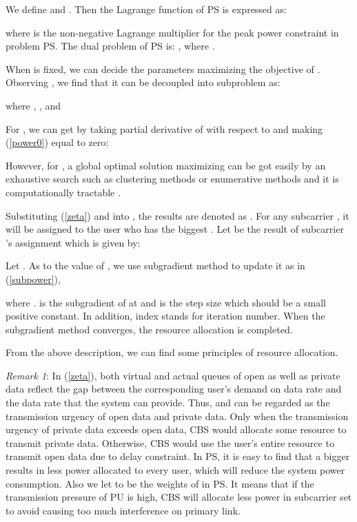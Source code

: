 \documentclass[journal]{IEEEtran}
\begin{document}
We define  and . Then the Lagrange function of PS is expressed
as:

where  is the non-negative Lagrange multiplier for the peak power constraint in problem PS.  The dual problem of
PS is:
,
where .


When  is fixed, we can decide the parameters  maximizing the objective of . Observing
, we find that it can be decoupled into  subproblem as:

where , ,
 and


 For , we can get  by taking partial derivative of 
 with respect to  and making (\ref{power0}) equal to zero:


 However, for ,  a  global optimal solution  maximizing  can be got easily by
 an exhaustive search such as clustering methods or enumerative methods\cite{horst1996global} and it is
 computationally tractable \cite{yu2006dual,cendrillon2006optimal}.






 Substituting (\ref{zeta}) and  into , the results are denoted as .
For any subcarrier , it will be assigned to the user who has the biggest . Let
 be the result of subcarrier 's assignment which is given by:



Let . As to the value of , we use subgradient method to
update it as in (\ref{subpower}),

where .   is the subgradient of   at  and
 is the step size which should be a small positive constant. In addition, index  stands for iteration number.
When the subgradient method converges, the resource allocation is completed.

From the above description, we can find some principles of  resource allocation.

\emph{Remark 1}: In (\ref{zeta}),  both virtual and actual
queues of open as well as private data reflect the gap  between the corresponding user's demand on data rate and the data
rate that the system can provide. Thus,  and  can be regarded as
the transmission urgency of open data and private data. Only when the transmission urgency of private data exceeds open data,
CBS would allocate some resource to transmit private data. Otherwise,  CBS would use the user's entire resource to transmit
open
data due to delay constraint. In PS, it is easy to find that a bigger  results in less power allocated to every user,
which will reduce the system power consumption. Also we let  to be the weights of  in PS. It means that if the
transmission pressure of PU is high, CBS will allocate less power in subcarrier set  to avoid
causing too much interference on primary link.
\end{document}
